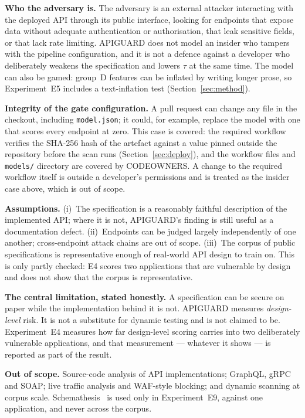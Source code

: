 \documentclass[conference]{IEEEtran}
\begin{document}
\textbf{Who the adversary is.} The adversary is an external attacker interacting with the
deployed API through its public interface, looking for endpoints that expose data without
adequate authentication or authorisation, that leak sensitive fields, or that lack rate
limiting. APIGUARD does not model an insider who tampers with the pipeline configuration, and
it is not a defence against a developer who deliberately weakens the specification and lowers
$\tau$ at the same time. The model can also be gamed: group~D features can be inflated by
writing longer prose, so Experiment~E5 includes a text-inflation test (Section~\ref{sec:method}).

\textbf{Integrity of the gate configuration.} A pull request can change any file in the
checkout, including \texttt{model.json}; it could, for example, replace the model with one
that scores every endpoint at zero. This case is covered: the required workflow verifies the
SHA-256 hash of the artefact against a value pinned outside the repository before the scan
runs (Section~\ref{sec:deploy}), and the workflow files and \texttt{models/} directory are
covered by CODEOWNERS. A change to the required workflow itself is outside a developer's
permissions and is treated as the insider case above, which is out of scope.

\textbf{Assumptions.} (i)~The specification is a reasonably faithful description of the
implemented API; where it is not, APIGUARD's finding is still useful as a documentation
defect. (ii)~Endpoints can be judged largely independently of one another; cross-endpoint
attack chains are out of scope. (iii)~The corpus of public specifications is representative
enough of real-world API design to train on. This is only partly checked: E4 scores two applications that are vulnerable by design and does not show that the corpus is representative.

\textbf{The central limitation, stated honestly.} A specification can be secure on paper while
the implementation behind it is not. APIGUARD measures \emph{design-level} risk. It is not a
substitute for dynamic testing and is not claimed to be. Experiment~E4 measures how far
design-level scoring carries into two deliberately vulnerable applications, and that
measurement --- whatever it shows --- is reported as part of the result.

\textbf{Out of scope.} Source-code analysis of API implementations; GraphQL, gRPC and SOAP;
live traffic analysis and WAF-style blocking; and dynamic scanning at corpus scale. Schemathesis~\cite{schemathesis}
is used only in Experiment~E9, against one application, and never across
the corpus.
\end{document}

